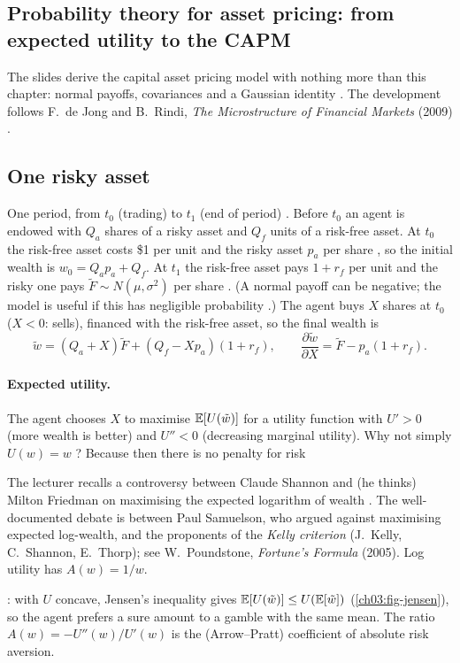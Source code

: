 \begin{paracol}{2}
\section{Probability theory for asset pricing: from expected utility to the CAPM}\label{ch03:sec-capm}

The slides  derive the capital asset pricing model with nothing more than this chapter:
normal payoffs, covariances and a Gaussian identity . The development follows F.~de Jong and
B.~Rindi, \emph{The Microstructure of Financial Markets} (2009) .

\subsection{One risky asset}
One period, from $t_0$ (trading) to $t_1$ (end of period) . Before $t_0$ an agent is endowed
with $Q_a$ shares of a risky asset and $Q_f$ units of a risk-free asset. At $t_0$ the risk-free asset costs \$1 per
unit and the risky asset $p_a$ per share , so the initial wealth is $w_0=Q_ap_a+Q_f$. At $t_1$ the
risk-free asset pays $1+r_f$ per unit and the risky one pays $\tilde F\sim N(\mu,\sigma^2)$ per share .
(A normal payoff can be negative; the model is useful if this has negligible probability .)
The agent buys $X$ shares at $t_0$ ($X<0$: sells), financed with the risk-free asset, so the final wealth is
\begin{equation}\label{ch03:eq-wealth}
  \tilde w=(Q_a+X)\tilde F+(Q_f-Xp_a)(1+r_f),\qquad \frac{\partial\tilde w}{\partial X}=\tilde F-p_a(1+r_f).
\end{equation}

\paragraph{Expected utility.} The agent chooses $X$ to maximise $\mathbb{E}[U(\tilde w)]$ for a utility function with
$U'>0$  (more wealth is better) and $U''<0$  (decreasing marginal utility). Why not
simply $U(w)=w$ ? Because then there is no penalty for risk \begin{coursenote}
The lecturer recalls a controversy between Claude Shannon and (he thinks) Milton Friedman on maximising the
expected logarithm of wealth . The well-documented debate is between Paul Samuelson, who argued
against maximising expected log-wealth, and the proponents of the \emph{Kelly criterion} (J.~Kelly,
C.~Shannon, E.~Thorp); see W.~Poundstone, \emph{Fortune's Formula} (2005). Log utility has $A(w)=1/w$.
\end{coursenote}: with $U$ concave,
Jensen's inequality gives $\mathbb{E}[U(\tilde w)]\le U(\mathbb{E}[\tilde w])$ (\cref{ch03:fig-jensen}), so the agent prefers a sure amount to a gamble with the
same mean. The ratio $A(w)=-U''(w)/U'(w)$ is the (Arrow--Pratt) coefficient of absolute risk aversion.


\end{paracol}
